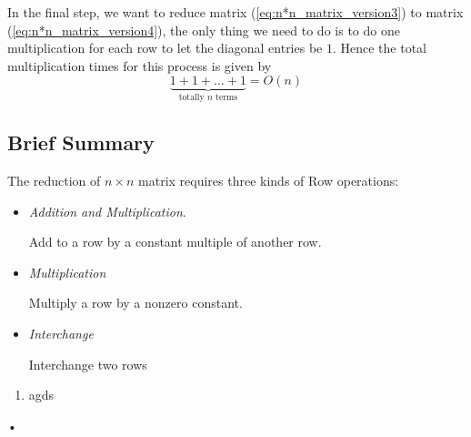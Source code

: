 In the final step, we want to reduce matrix (\ref{eq:n*n_matrix_version3}) to matrix (\ref{eq:n*n_matrix_version4}), the only thing we need to do is to do one multiplication for each row to let the diagonal entries be $1$. Hence the total multiplication times for this process is given by
\[
\underbrace{1+1+\dots+1}_{\text{totally $n$ terms}} = O(n)
\]
\subsection{Brief Summary}
The reduction of $n\times n$ matrix requires three kinds of Row operations:
\begin{itemize}
\item \emph{Addition and Multiplication}.

Add to a row by a constant multiple of another row.

\item \emph{Multiplication}

Multiply a row by a nonzero constant.
\item \emph{Interchange}

Interchange two rows
\end{itemize}


\begin{enumerate}
\item
agds
\end{enumerate}•